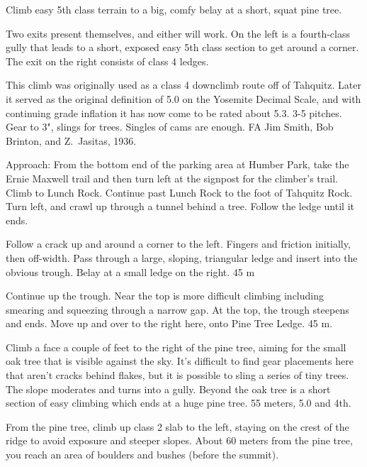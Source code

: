 \documentclass{tahquitz}
\begin{document}
 Climb easy 5th class terrain to a big, comfy belay at a short, squat pine tree.

 Two exits present themselves, and either will work. On the left is a fourth-class
gully that leads to a short, exposed easy 5th class section to get around a corner.
The exit on the right consists of class 4 ledges.

\somespace

\northgully




This climb was originally used as a class 4 downclimb route off of Tahquitz.
Later it served as the original definition of 5.0 on the Yosemite Decimal
Scale, and with continuing grade inflation it has now come to be
rated about 5.3. 3-5 pitches. Gear to 3",
slings for trees. Singles of cams are enough.
FA Jim Smith, Bob Brinton, and Z.~Jasitas, 1936.

Approach: From the bottom end of the parking area at Humber Park,
take the Ernie Maxwell trail and then turn left at the signpost for
the climber's trail. Climb to Lunch Rock. Continue past Lunch Rock to
the foot of Tahquitz Rock. Turn left, and crawl up through a tunnel
behind a tree. Follow the ledge until it ends.

\somespace

 Follow a crack up and around a corner to the left. Fingers and
friction initially, then off-width. Pass through a large, sloping,
triangular ledge and insert into the obvious trough. Belay at a small
ledge on the right. 45 m

 Continue up the trough. Near the top is more difficult climbing
including smearing and squeezing through a narrow gap. At the top,
the trough steepens and ends. Move up and over to the right here,
onto Pine Tree Ledge. 45 m.

 Climb a face a couple of feet to the right of the pine tree,
aiming for the small oak tree that is visible against the sky. It's
difficult to find gear placements here that aren't cracks behind
flakes, but it is possible to sling a series of tiny trees. The slope
moderates and turns into a gully. Beyond the oak tree is a short
section of easy climbing which ends at a huge pine tree. 55 meters,
5.0 and 4th.

From the pine tree, climb up class 2 slab to the left, staying on
the crest of the ridge to avoid exposure and steeper slopes. About 60
meters from the pine tree, you reach an area of boulders and bushes
(before the summit).
\end{document}

